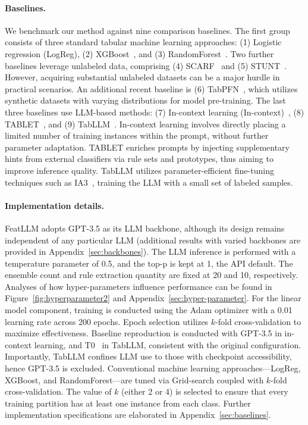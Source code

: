\vspace*{-0.12in}
\paragraph{Baselines.}
We benchmark our method against nine comparison baselines. The first group consists of three standard tabular machine learning approaches: (1) Logistic regression (LogReg), (2) XGBoost~\cite{chen2016xgboost}, and (3) RandomForest~\cite{ho1995random}. Two further baselines leverage unlabeled data, comprising (4) SCARF~\cite{bahri2022scarf} and (5) STUNT~\cite{nam2023stunt}. However, acquiring substantial unlabeled datasets can be a major hurdle in practical scenarios. An additional recent baseline is (6) TabPFN~\cite{hollmann2022tabpfn}, which utilizes synthetic datasets with varying distributions for model pre-training. The last three baselines use LLM-based methods: (7) In-context learning (In-context)~\cite{wei2022emergent}, (8) TABLET~\cite{slack2023tablet}, and (9) TabLLM~\cite{hegselmann2023tabllm}. In-context learning involves directly placing a limited number of training instances within the prompt, without further parameter adaptation. TABLET enriches prompts by injecting supplementary hints from external classifiers via rule sets and prototypes, thus aiming to improve inference quality. TabLLM utilizes parameter-efficient fine-tuning techniques such as IA3~\cite{liu2022few}, training the LLM with a small set of labeled samples.

\vspace*{-0.12in}
\paragraph{Implementation details.}
\textsf{FeatLLM} adopts GPT-3.5 as its LLM backbone, although its design remains independent of any particular LLM (additional results with varied backbones are provided in Appendix~\ref{sec:backbones}). The LLM inference is performed with a temperature parameter of 0.5, and the top-p is kept at 1, the API default. The ensemble count and rule extraction quantity are fixed at 20 and 10, respectively. Analyses of how hyper-parameters influence performance can be found in Figure~\ref{fig:hyperparameter2} and Appendix~\ref{sec:hyper-parameter}. For the linear model component, training is conducted using the Adam optimizer with a 0.01 learning rate across 200 epochs. Epoch selection utilizes $k$-fold cross-validation to maximize effectiveness. Baseline reproduction is conducted with GPT-3.5 in in-context learning, and T0~\cite{sanh2022multitask} in TabLLM, consistent with the original configuration. Importantly, TabLLM confines LLM use to those with checkpoint accessibility, hence GPT-3.5 is excluded. Conventional machine learning approaches—LogReg, XGBoost, and RandomForest—are tuned via Grid-search coupled with $k$-fold cross-validation. The value of $k$ (either 2 or 4) is selected to ensure that every training partition has at least one instance from each class. Further implementation specifications are elaborated in Appendix~\ref{sec:baselines}.

